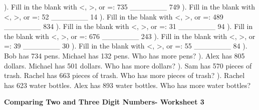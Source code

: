 \documentclass{article}%
\begin{document}
). Fill in the blank with <, >, or =: 735 \_\_\_\_\_\_\_ 749%
\newline%
\newline%
). Fill in the blank with <, >, or =: 52 \_\_\_\_\_\_\_ 14%
\newline%
\newline%
). Fill in the blank with <, >, or =: 489 \_\_\_\_\_\_\_ 834%
\newline%
\newline%
). Fill in the blank with <, >, or =: 31 \_\_\_\_\_\_\_ 94%
\newline%
\newline%
). Fill in the blank with <, >, or =: 676 \_\_\_\_\_\_\_ 243%
\newline%
\newline%
). Fill in the blank with <, >, or =: 39 \_\_\_\_\_\_\_ 30%
\newline%
\newline%
). Fill in the blank with <, >, or =: 55 \_\_\_\_\_\_\_ 84%
\newline%
\newline%
). Bob has 734 pens. Michael has 132 pens. Who has more pens?%
\newline%
\newline%
). Alex has 805 dollars. Michael has 501 dollars. Who has more dollars?%
\newline%
\newline%
). Sam has 570 pieces of trash. Rachel has 663 pieces of trash. Who has more pieces of trash?%
\newline%
\newline%
). Rachel has 623 water bottles. Alex has 893 water bottles. Who has more water bottles?%
\newline%
\newline%
\newline%
\pagebreak%
\large%
\begin{center}%
\textbf{Comparing Two and Three Digit Numbers- Worksheet 3}%
\newline%
\end{center} \normalsize%
\end{document}
